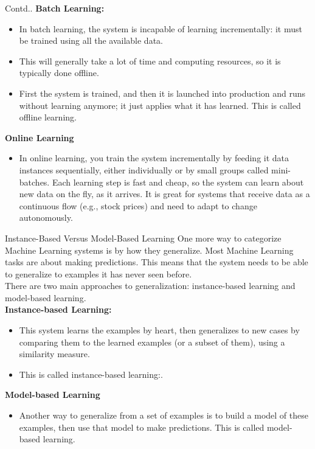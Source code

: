 \documentclass{beamer}
\begin{document}
\begin{frame}
\begin{block}{Contd..}
\textbf{Batch Learning:}\\
\begin{itemize}
    \item In batch learning, the system is incapable of learning incrementally: it must be trained using all the available data. \item This will generally take a lot of time and computing resources, so it is typically done offline. 
    \item First the system is trained, and then it is launched into production and runs without learning anymore; it just applies what it has learned. This is called offline learning.
\end{itemize}
\textbf{Online Learning}\\
\begin{itemize}
    \item In online learning, you train the system incrementally by feeding it data instances sequentially, either individually or by small groups called mini-batches. Each learning step is fast and cheap, so the system can learn about new data on the fly, as it arrives. It is great for systems that receive data as a continuous flow (e.g., stock prices) and need to adapt to change autonomously.
\end{itemize}
\end{block}
\end{frame}

\begin{frame}
\begin{block}{Instance-Based Versus Model-Based Learning}
One more way to categorize Machine Learning systems is by how they generalize. Most Machine Learning tasks are about making predictions. This means that the system needs to be able to generalize to examples it has never seen before.\\
\vspace{10pt}
There are two main approaches to generalization: instance-based learning and model-based learning.\\
\textbf{Instance-based Learning:}\\
\begin{itemize}
    \item This system learns the examples by heart, then
generalizes to new cases by comparing them to the learned examples (or a subset of them), using a similarity measure.
    \item This is called instance-based learning:.
\end{itemize}
\textbf{Model-based Learning}\\
\begin{itemize}
    \item Another way to generalize from a set of examples is to build a model of these examples, then use that model to make predictions. This is called model-based learning. 
\end{itemize}
\end{block}
\end{frame}
\end{document}
